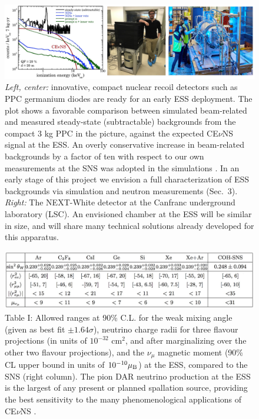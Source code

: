 \documentclass[12pt]{article}
\begin{document}
\begin{figure}[H]
\begin{center}
\includegraphics[width=6.5in]{fig3.eps}
\caption{\label{fig:fig3} \scriptsize {\it Left, center:} innovative, compact nuclear recoil detectors such as PPC germanium diodes \cite{ppc} are ready for an early ESS deployment. The plot shows a favorable comparison between simulated beam-related and measured steady-state (subtractable) backgrounds from the compact 3 kg PPC in the picture, against the expected CE$\nu$NS signal at the ESS. An overly conservative increase in beam-related backgrounds by a factor of ten with respect to our own measurements at the SNS  was adopted in the simulations \cite{ESS}. In an early stage of this project we envision a full characterization of ESS backgrounds via simulation and neutron measurements (Sec.\ 3). {\it Right:} The NEXT-White detector at the Canfranc underground laboratory (LSC). An envisioned chamber at the ESS will be similar in size, and will share many technical solutions already developed for this apparatus.}
\end{center}
\end{figure}


\begin{figure}[H]
\begin{center}
\includegraphics[width=6.5in]{table.eps}
\caption{\label{fig:figx} \scriptsize 
Table I: Allowed ranges at 90\% C.L. for the weak mixing
  angle (given as best fit $\pm 1.64 \sigma$), neutrino charge radii for three flavour
  projections  (in units of $10^{-32}$ cm$^2$, and after
  marginalizing over the other two flavour projections), and 
  the $\nu_\mu$ magnetic moment (90\% CL upper bound in units of
  $10^{-10} \mu_{\rm B}$) at the ESS, compared to the SNS (right column). The pion DAR neutrino production at the ESS is the largest of any present or planned spallation source, providing the best sensitivity to the many phenomenological applications of CE$\nu$NS \cite{ESS}. }
\end{center} 
\end{figure}
\end{document}

